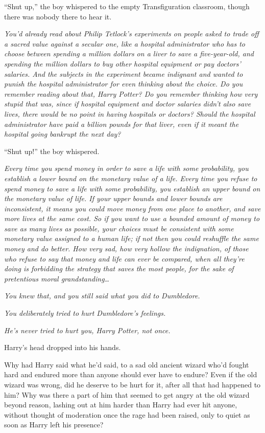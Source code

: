 “Shut up,” the boy whispered to the empty Transfiguration classroom, though there was nobody there to hear it.

\emph{You’d already read about Philip Tetlock’s experiments on people asked to trade off a sacred value against a secular one, like a hospital administrator who has to choose between spending a million dollars on a liver to save a five-year-old, and spending the million dollars to buy other hospital equipment or pay doctors’ salaries. And the subjects in the experiment became indignant and wanted to punish the hospital administrator for even thinking about the choice. Do you remember reading about that, Harry Potter? Do you remember thinking how very stupid that was, since if hospital equipment and doctor salaries didn’t also save lives, there would be no point in having hospitals or doctors? Should the hospital administrator have paid a billion pounds for that liver, even if it meant the hospital going bankrupt the next day?}

“Shut up!” the boy whispered.

\emph{Every time you spend money in order to save a life with some probability, you establish a lower bound on the monetary value of a life. Every time you refuse to spend money to save a life with some probability, you establish an upper bound on the monetary value of life. If your upper bounds and lower bounds are inconsistent, it means you could move money from one place to another, and save more lives at the same cost. So if you want to use a bounded amount of money to save as many lives as possible, your choices must be consistent with \emph{some} monetary value assigned to a human life; if not then you could reshuffle the same money and do better. How very sad, how very hollow the indignation, of those who refuse to say that money and life can ever be compared, when all they’re doing is forbidding the strategy that saves the most people, for the sake of pretentious moral grandstanding…}

\emph{You \emph{knew} that, and you still said what you did to Dumbledore.}

\emph{You deliberately \emph{tried} to hurt Dumbledore’s feelings.}

\emph{\emph{He’s} never tried to hurt \emph{you,} Harry Potter, not once.}

Harry’s head dropped into his hands.

Why had Harry said what he’d said, to a sad old ancient wizard who’d fought hard and endured more than anyone should ever have to endure? Even if the old wizard was wrong, did he deserve to be hurt for it, after all that had happened to him? Why was there a part of him that seemed to get angry at the old wizard beyond reason, lashing out at him harder than Harry had ever hit anyone, without thought of moderation once the rage had been raised, only to quiet as soon as Harry left his presence?

